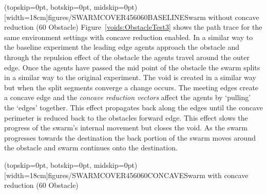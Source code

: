 \documentclass{ieeeaccess}
\begin{document}
\Figure[t!](topskip=0pt, botskip=0pt, midskip=0pt)[width=18cm]{figures/SWARMCOVER456060BASELINE}{Swarm without concave reduction (60 Obstacle)\label{voids:ObstacleTest2}}
Figure~\ref{voids:ObstacleTest3} shows the path trace for the same environment settings with concave reduction enabled. In a similar way to the baseline experiment the leading edge agents approach the obstacle and through the repulsion effect of the obstacle the agents travel around the outer edge. Once the agents have passed the mid point of the obstacle the swarm splits in a similar way to the original experiment. The void is created in a similar way but when the split segments converge a change occurs. The meeting edges create a concave edge and the \textit{concave reduction vectors} affect the agents by `pulling' the `edges' together. This effect propagates back along the edges until the concave perimeter is reduced back to the obstacles forward edge. This effect slows the progress of the swarm's internal movement but closes the void. As the swarm progresses towards the destination the back portion of the swarm moves around the obstacle and swarm continues onto the destination.

\Figure[t!](topskip=0pt, botskip=0pt, midskip=0pt)[width=18cm]{figures/SWARMCOVER456060CONCAVE}{Swarm with concave reduction (60 Obstacle)\label{voids:ObstacleTest3}}
\end{document}
